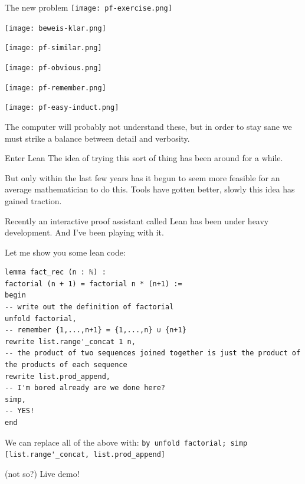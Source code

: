 {\begin{frame}{The new problem}
    \texttt{[image: pf-exercise.png]}\pause

    \texttt{[image: beweis-klar.png]}\pause

    \texttt{[image: pf-similar.png]}\pause

    \texttt{[image: pf-obvious.png]}\pause

    \texttt{[image: pf-remember.png]}\pause

    \texttt{[image: pf-easy-induct.png]}\pause

    The computer will probably not understand these, but in order to stay sane we must strike a balance between detail and verbosity.
\end{frame}

\begin{frame}{Enter Lean}
    The idea of trying this sort of thing has been around for a while. \pause

    But only within the last few years has it begun to seem more feasible for an average mathematician to do this. Tools have gotten better, slowly this idea has gained traction.\pause

    Recently an interactive proof assistant called Lean has been under heavy development. And I've been playing with it.

    Let me show you some lean code:
\end{frame}

\begin{frame}[fragile]
\begin{lstlisting}
lemma fact_rec (n : ℕ) :
factorial (n + 1) = factorial n * (n+1) :=
begin
-- write out the definition of factorial
unfold factorial,
-- remember {1,...,n+1} = {1,...,n} ∪ {n+1}
rewrite list.range'_concat 1 n,
-- the product of two sequences joined together is just the product of the products of each sequence
rewrite list.prod_append,
-- I'm bored already are we done here?
simp,
-- YES!
end
\end{lstlisting}\pause
We can replace all of the above with: \lstinline{by unfold factorial; simp [list.range'_concat, list.prod_append]}

\end{frame}

\begin{frame}{(not so?) Live demo!}
\end{frame}

}
